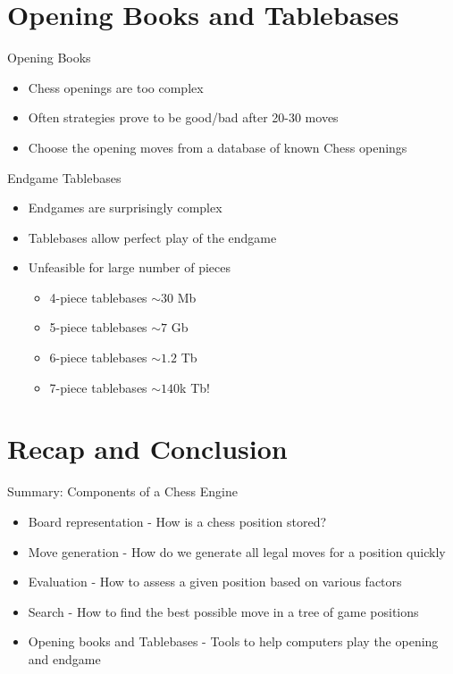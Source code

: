 \documentclass[xcolor=pdftex,dvipsnames,table]{beamer}
\begin{document}
\section{Opening Books and Tablebases}

\begin{frame}{Opening Books}
\begin{itemize}
\item Chess openings are too complex
\item Often strategies prove to be good/bad after 20-30 moves
\item Choose the opening moves from a database of known Chess openings
\end{itemize}
\end{frame}

\begin{frame}{Endgame Tablebases}
\begin{itemize}
\item Endgames are surprisingly complex
\item Tablebases allow perfect play of the endgame
\item Unfeasible for large number of pieces
  \begin{itemize}
  \item[\textbullet] 4-piece tablebases $\sim 30$ Mb
  \item[\textbullet] 5-piece tablebases $\sim 7$ Gb
  \item[\textbullet] 6-piece tablebases $\sim 1.2$ Tb
  \item[\textbullet] 7-piece tablebases $\sim 140$k Tb!
  \end{itemize}
\end{itemize}
\end{frame}

\section{Recap and Conclusion}

\begin{frame}{Summary: Components of a Chess Engine}
\begin{itemize}
\item Board representation - How is a chess position stored?
\item Move generation - How do we generate all legal moves for a position quickly
\item Evaluation - How to assess a given position based on various factors
\item Search - How to find the best possible move in a tree of game positions
\item Opening books and Tablebases - Tools to help computers play the opening and endgame
\end{itemize}
\end{frame}
\end{document}
